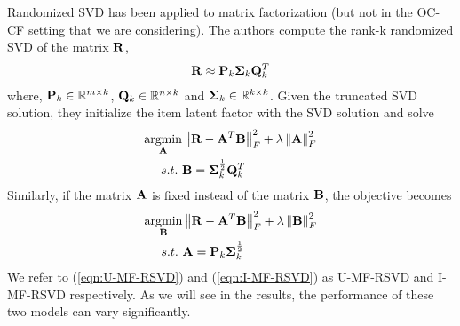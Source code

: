 Randomized SVD has been applied to matrix factorization \citep{Tang:2013} 
(but not in the OC-CF setting that we are considering). 
The authors compute the rank-k randomized SVD of the matrix $\R$,
\begin{align*}
	\R \approx \P_k \Sig_k \Q^T_k
\end{align*}
where, $\P_k \in \mathbb{R}^{m \times k}$, $\Q_k \in \mathbb{R}^{n \times k}$ and $\Sig_k \in \mathbb{R}^{k \times k}$. Given the truncated SVD solution, they initialize the item latent factor with the SVD solution and solve 
\begin{align}
\label{eqn:I-MF-RSVD}
\underset{\A}{\mathrm{argmin}} & \left \| \R - \A^T\B\right \|_F^2 + \lambda \left \|  \A \right \|_F^2   \\
s.t.\ & \B = \Sig_k^{\frac{1}{2}} \Q^T_k 
\end{align}
Similarly, if the matrix $\A$ is fixed instead of the matrix $\B$, the objective becomes
\begin{align}
\label{eqn:U-MF-RSVD}
\underset{\B}{\mathrm{argmin}} & \left \| \R - \A^T\B\right \|_F^2 + \lambda \left \|  \B \right \|_F^2 \\
s.t.\ & \A = \P_k \Sig_k^{\frac{1}{2}}
\end{align}
We refer to (\ref{eqn:U-MF-RSVD}) and (\ref{eqn:I-MF-RSVD}) as U-MF-RSVD and I-MF-RSVD respectively. As we will see in the results, the performance of these two models can vary significantly.
